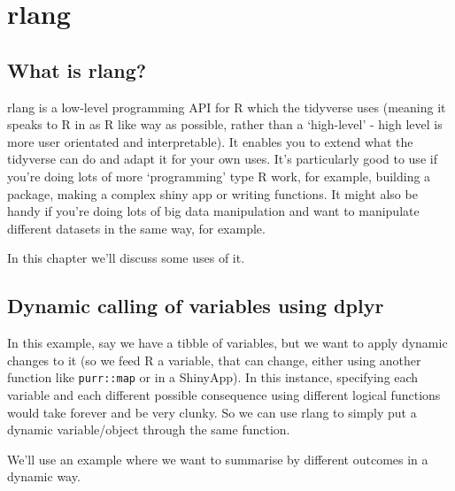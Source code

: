 \documentclass[
]{book}
\begin{document}
\hypertarget{rlang}{%
\section{rlang}\label{rlang}}

\hypertarget{what-is-rlang}{%
\subsection{What is rlang?}\label{what-is-rlang}}

rlang is a low-level programming API for R which the tidyverse uses (meaning it speaks to R in as R like way as possible, rather than a `high-level' - high level is more user orientated and interpretable). It enables you to extend what the tidyverse can do and adapt it for your own uses. It's particularly good to use if you're doing lots of more `programming' type R work, for example, building a package, making a complex shiny app or writing functions. It might also be handy if you're doing lots of big data manipulation and want to manipulate different datasets in the same way, for example.

In this chapter we'll discuss some uses of it.

\hypertarget{dynamic-calling-of-variables-using-dplyr}{%
\subsection{Dynamic calling of variables using dplyr}\label{dynamic-calling-of-variables-using-dplyr}}

In this example, say we have a tibble of variables, but we want to apply dynamic changes to it (so we feed R a variable, that can change, either using another function like \texttt{purr::map} or in a ShinyApp). In this instance, specifying each variable and each different possible consequence using different logical functions would take forever and be very clunky. So we can use rlang to simply put a dynamic variable/object through the same function.

We'll use an example where we want to summarise by different outcomes in a dynamic way.
\end{document}
